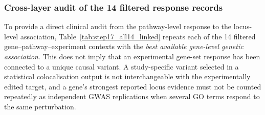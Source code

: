 \documentclass[11pt,a4paper]{article}
\begin{document}
\subsubsection{Cross-layer audit of the 14 filtered response records}
\label{subsec:step17_crosslayer}
To provide a direct clinical audit from the pathway-level response to the locus-level association, Table~\ref{tab:step17_all14_linked} repeats each of the 14 filtered gene--pathway--experiment contexts with the \emph{best available gene-level genetic association}. This does not imply that an experimental gene-set response has been connected to a unique causal variant. A study-specific variant selected in a statistical colocalisation output is not interchangeable with the experimentally edited target, and a gene's strongest reported locus evidence must not be counted repeatedly as independent GWAS replications when several GO terms respond to the same perturbation.
\end{document}
